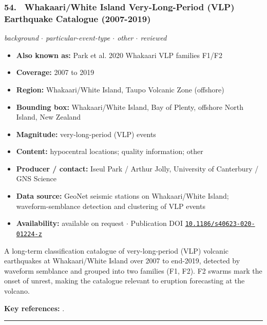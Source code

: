 \documentclass[10pt,a4paper]{article}
\newcommand{\catentryrule}{\par\vspace{3pt}\noindent\textcolor{rulegrey}{\rule{\linewidth}{0.3pt}}\par\vspace{5pt}}
\newcommand{\kv}[2]{\item \textbf{#1:} #2}
\begin{document}
\subsubsection*{\hypertarget{c:54}{54.}~ Whakaari/White Island Very-Long-Period (VLP) Earthquake Catalogue (2007-2019)}
{\small\itshape background $\cdot$ particular-event-type $\cdot$ other $\cdot$ reviewed}\par\vspace{2pt}
\begin{itemize}[leftmargin=1.3em,itemsep=0.6pt,topsep=1pt,parsep=0pt]
\kv{Also known as}{Park et al. 2020 Whakaari VLP families F1/F2}
\kv{Coverage}{2007 to 2019}
\kv{Region}{Whakaari/White Island, Taupo Volcanic Zone (offshore)}
\kv{Bounding box}{Whakaari/White Island, Bay of Plenty, offshore North Island, New Zealand}
\kv{Magnitude}{very-long-period (VLP) events}
\kv{Content}{hypocentral locations; quality information; other}
\kv{Producer / contact}{Iseul Park / Arthur Jolly, University of Canterbury / GNS Science}
\kv{Data source}{GeoNet seismic stations on Whakaari/White Island; waveform-semblance detection and clustering of VLP events}
\kv{Availability}{available on request $\cdot$ Publication DOI \href{https://doi.org/10.1186/s40623-020-01224-z}{\nolinkurl{10.1186/s40623-020-01224-z}}}
\end{itemize}
\par\vspace{2pt}A long-term classification catalogue of very-long-period (VLP) volcanic earthquakes at Whakaari/White Island over 2007 to end-2019, detected by waveform semblance and grouped into two families (F1, F2). F2 swarms mark the onset of unrest, making the catalogue relevant to eruption forecasting at the volcano.
\par\vspace{2pt}\textbf{Key references:} \cite{Park2020}.
\catentryrule
\end{document}
